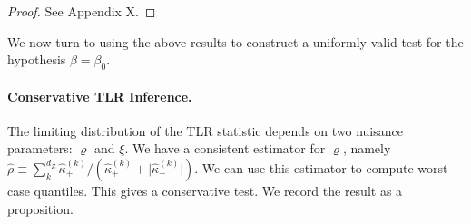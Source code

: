 \begin{proof}
    See Appendix X.
\end{proof}
\noindent


\noindent 
We now turn to using the above results to
construct a uniformly valid test for the hypothesis \(\beta=\beta_0\).


\paragraph*{Conservative TLR Inference.}

The limiting distribution of the TLR statistic depends on two nuisance parameters: \(\varrho\) and \(\xi\). We have a consistent estimator for \(\varrho\), namely \(\hat \rho\equiv \sum_{k}^{d_Z}\hat \kappa^{(k)}_{+}/(\hat\kappa^{(k)}_{+}+\lvert \hat\kappa^{(k)}_{-}\rvert)\). We can use this estimator to compute worst-case quantiles. This gives a conservative test. We record the result as a proposition.

